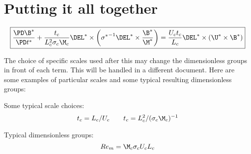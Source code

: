 \documentclass[11pt]{article}
\begin{document}
\section{Putting it all together}
\begin{equation}
	\boxed{
	\frac{\PD \B^*}{\PD t^*}
	+ \frac{t_c}{L_c^2 \sigma_c \M_c} \DEL^* \times \left( {\sigma^*}^{-1}\DEL^* \times \frac{\B^*}{\M^*} \right)
	= \frac{U_c t_c}{L_c} \DEL^* \times (\U^* \times \B^*)
	}
\end{equation}

The choice of specific scales used after this may change the dimensionless groups in front of each term. This will be handled in a different document. Here are some examples of particular scales and some typical resulting dimensionless groups:

Some typical scale choices:
\begin{equation}\begin{aligned}
	t_c = L_c/ U_c \qquad
	t_c = L_c^2/ (\sigma_c \M_c)^{-1}
\end{aligned}\end{equation}

Typical dimensionless groups:
\begin{equation}
	Re_m = \M_c \sigma_c U_c L_c
\end{equation}
\end{document}
